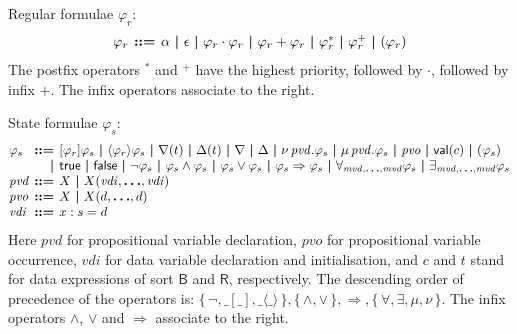 \documentclass[a4paper,fleqn,10pt]{article}
\makeatletter
\newcommand{\f}[1]{\ensuremath{\mathit{#1}}}
\newcommand{\sbool}{\ensuremath{\mathsf{B}}}
\newcommand{\sreal}{\ensuremath{\mathsf{R}}}
\newenvironment{tightarray}[1]
  {\setlength{\arraycolsep}{2pt}%
   \begin{array}{@{}#1@{}}%
  }
  {\end{array}%
  }
\newcommand{\set}[1]{\ensuremath{\{\,#1\,\}}}
\newcommand{\limp}{\ensuremath{\Rightarrow}}
\newcommand{\mb}[1]{\text{\boldmath$#1$}}
\makeatother
\begin{document}
Regular formulae $\varphi_r$:
\[\begin{tightarray}{lrl}
\varphi_r & \mb{::=} & \alpha\ \mb{|}\ 
                       \epsilon\ \mb{|}\ 
                       \varphi_r \cdot \varphi_r\ \mb{|}\ 
                       \varphi_r + \varphi_r\ \mb{|}\ 
                       \varphi_r^{*} \ \mb{|}\ 
                       \varphi_r^{+} \ \mb{|}\ 
                       ( \varphi_r )
\end{tightarray}\]
The postfix operators ${}^{*}$ and ${}^{+}$ have the highest priority, followed
by $\cdot$, followed by infix $+$. The infix operators associate to the right.

State formulae $\varphi_s$:
\[\begin{tightarray}{lrl}
\varphi_s & \mb{::=} & [\varphi_r]\varphi_s\ \mb{|}\ 
                       \langle\varphi_r\rangle\varphi_s\ \mb{|}\ 
                       \nabla(t)\ \mb{|}\ 
                       \Delta(t)\ \mb{|}\ 
                       \nabla\ \mb{|}\ 
                       \Delta\ \mb{|}\ 
                       \nu\,\f{pvd}.\varphi_s\ \mb{|}\ 
                       \mu\,\f{pvd}.\varphi_s\ \mb{|}\ 
                       \f{pvo}\ \mb{|}\ 
                       \mathsf{val}(c)\ \mb{|}\ 
                       ( \varphi_s )\\
          & \mb{|}   & \mathsf{true}\ \mb{|}\ 
                       \mathsf{false}\ \mb{|}\ 
                       \neg \varphi_s\ \mb{|}\ 
                       \varphi_s \land \varphi_s\ \mb{|}\ 
                       \varphi_s \lor  \varphi_s\ \mb{|}\ 
                       \varphi_s \limp \varphi_s\ \mb{|}\ 
                       \forall_{\f{mvd},\mb{\ldots},\f{mvd}} \varphi_s\ \mb{|}\ 
                       \exists_{\f{mvd},\mb{\ldots},\f{mvd}} \varphi_s\\
\f{pvd} & \mb{::=} & X\ \mb{|}\ X(\f{vdi},\mb{\ldots},\f{vdi})\\
\f{pvo} & \mb{::=} & X\ \mb{|}\ X(d,\mb{\ldots},d)\\
\f{vdi} & \mb{::=} & x: s = d\\
\end{tightarray}\]
Here 
$\f{pvd}$ for propositional variable declaration,
$\f{pvo}$ for propositional variable occurrence,
$\f{vdi}$ for data variable declaration and initialisation,
and $c$ and $t$ stand for data expressions of
sort $\sbool$ and $\sreal$, respectively.  The descending order of precedence
of the operators is: $\set{\neg, \_[\_], \_\langle\_\rangle},
\set{\land,\lor}, \limp, \set{\forall, \exists, \mu, \nu}$.  The infix
operators $\land$, $\lor$ and $\limp$ associate to the right.
\end{document}

